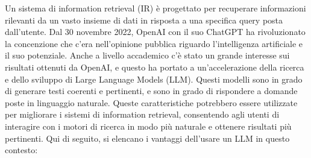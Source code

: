 Un sistema di information retrieval (IR) è progettato per recuperare informazioni rilevanti da un vasto insieme di dati in risposta a una specifica query posta dall'utente. 
Dal 30 novembre 2022, OpenAI con il suo ChatGPT ha rivoluzionato la concenzione che c'era nell'opinione pubblica riguardo l'intelligenza artificiale e il suo potenziale. Anche a livello accademico c'è stato un grande interesse sui risultati ottenuti da OpenAI, e questo ha portato a un'accelerazione della ricerca e dello sviluppo di Large Language Models (LLM).
Questi modelli sono in grado di generare testi coerenti e pertinenti, e sono in grado di rispondere a domande poste in linguaggio naturale. 
Queste caratteristiche potrebbero essere utilizzate per migliorare i sistemi di information retrieval, consentendo agli utenti di interagire con i motori di ricerca in modo più naturale e ottenere risultati più pertinenti.
Qui di seguito, si elencano i vantaggi dell'usare un LLM in questo contesto:
